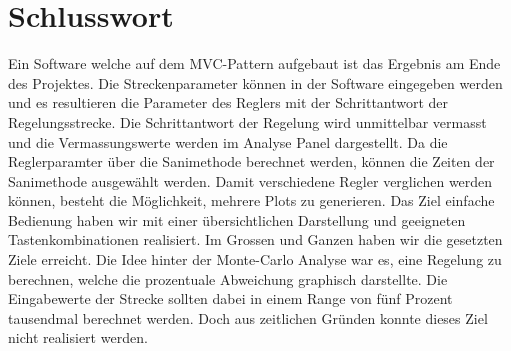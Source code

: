 \section{Schlusswort}
Ein Software welche auf dem MVC-Pattern aufgebaut ist das Ergebnis am Ende des Projektes. Die Streckenparameter können in der Software eingegeben werden und es resultieren die Parameter des Reglers mit der Schrittantwort der Regelungsstrecke. Die Schrittantwort der Regelung wird unmittelbar vermasst und die Vermassungswerte werden im Analyse Panel dargestellt. Da die Reglerparamter über die Sanimethode berechnet werden, können die Zeiten der Sanimethode ausgewählt werden. Damit verschiedene Regler verglichen werden können, besteht die Möglichkeit, mehrere Plots zu generieren. Das Ziel einfache Bedienung haben wir mit einer übersichtlichen Darstellung und geeigneten Tastenkombinationen realisiert.
Im Grossen und Ganzen haben wir die gesetzten Ziele erreicht. Die Idee hinter der Monte-Carlo Analyse war es, eine Regelung zu berechnen, welche die prozentuale Abweichung graphisch darstellte. Die Eingabewerte der Strecke sollten dabei in einem Range von fünf Prozent tausendmal berechnet werden. Doch aus zeitlichen Gründen konnte dieses Ziel nicht realisiert werden.
